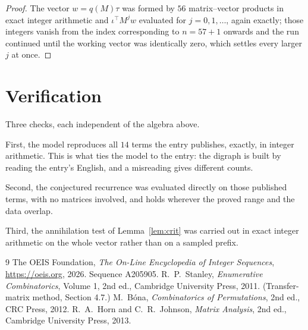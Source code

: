 \documentclass[11pt,a4paper]{article}
\theoremstyle{plain}
\theoremstyle{definition}
\begin{document}
\begin{proof}
The vector $w=q(M)\tau$ was formed by $56$ matrix--vector products in exact integer
arithmetic and $\iota^{\!\top}M^{j}w$ evaluated for $j=0,1,\dots$, again exactly; those
integers vanish from the index corresponding to $n=57+1$ onwards and the run continued
until the working vector was identically zero, which settles every larger $j$ at once.
\end{proof}

\section{Verification}

Three checks, each independent of the algebra above.

First, the model reproduces all $14$ terms the entry publishes, exactly, in integer
arithmetic. This is what ties the model to the entry: the digraph is built by reading the
entry's English, and a misreading gives different counts.

Second, the conjectured recurrence was evaluated directly on those published terms, with no
matrices involved, and holds wherever the proved range and the data overlap.

Third, the annihilation test of Lemma~\ref{lem:crit} was carried out in exact integer
arithmetic on the whole vector rather than on a sampled prefix.

\begin{thebibliography}{9}
 The OEIS Foundation, \emph{The On-Line Encyclopedia of Integer
Sequences}, \url{https://oeis.org}, 2026. Sequence A205905.
 R.~P.~Stanley, \emph{Enumerative Combinatorics}, Volume 1, 2nd ed.,
Cambridge University Press, 2011. (Transfer-matrix method, Section 4.7.)
 M.~B\'ona, \emph{Combinatorics of Permutations}, 2nd ed., CRC
Press, 2012.
 R.~A.~Horn and C.~R.~Johnson, \emph{Matrix Analysis}, 2nd ed., Cambridge
University Press, 2013.
\end{thebibliography}
\end{document}
